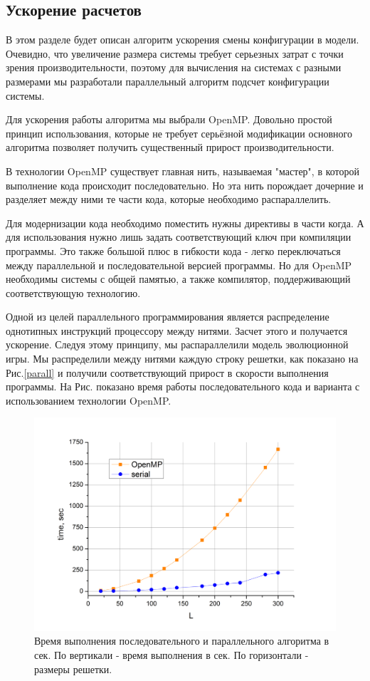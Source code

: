 \documentclass[a4paper]{article}
\begin{document}
	\subsection{Ускорение расчетов}
	
	\par В этом разделе будет описан алгоритм ускорения смены конфигурации в модели. Очевидно, что увеличение размера системы требует серьезных затрат с точки зрения производительности, поэтому для вычисления на системах с разными размерами мы разработали параллельный алгоритм подсчет конфигурации системы.
	
	\par Для ускорения работы алгоритма мы выбрали OpenMP\cite{OpenMP}. Довольно простой принцип использования, которые не требует серьёзной модификации основного алгоритма позволяет получить существенный прирост производительности.
	
	\par В технологии OpenMP существует главная нить, называемая "мастер", в которой выполнение кода происходит последовательно. Но эта нить порождает дочерние и разделяет между ними те части кода, которые необходимо распараллелить. 
	
	\par Для модернизации кода необходимо поместить нужны директивы в части когда. А для использования нужно лишь задать соответствующий ключ при компиляции программы. Это также большой плюс в гибкости кода - легко переключаться между параллельной и последовательной версией программы. Но для OpenMP необходимы системы с общей памятью, а также компилятор, поддерживающий соответствующую технологию.
	
	\par Одной из целей параллельного программирования является распределение однотипных инструкций процессору между нитями. Засчет этого и получается ускорение. Следуя этому принципу, мы распараллелили модель эволюционной игры. Мы распределили между нитями каждую строку решетки, как показано на Рис.\ref{parall} и получили соответствующий прирост в скорости выполнения программы. На Рис. показано время работы последовательного кода и варианта с использованием технологии OpenMP.
	
	\begin{figure}
		\centering
		\includegraphics[width=0.7\linewidth]{time.png}
		\caption{Время выполнения последовательного и параллельного алгоритма в сек. По вертикали - время выполнения в сек. По горизонтали - размеры решетки.}
		\label{time}		
	\end{figure}
	
\end{document}
